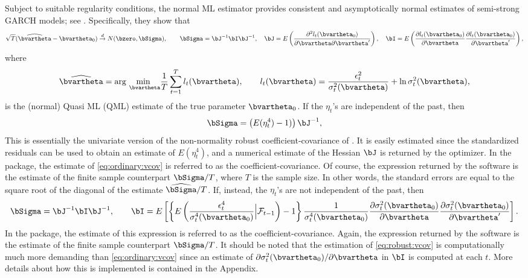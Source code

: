 Subject to suitable regularity conditions, the normal ML estimator provides consistent and asymptotically normal estimates of semi-strong GARCH models; see \citet{FrancqThieu2018}. Specifically, they show that
%
\begin{equation}\label{eq:can:result}
	\sqrt{T}(\widehat{\bvartheta} - \bvartheta_0) \overset{d}{\rightarrow} N(\bzero,\bSigma), \qquad \bSigma = \bJ^{-1}\bI\bJ^{-1}, \quad \bJ = E\left( \frac{ \partial^2 l_t(\bvartheta_0) }{ \partial\bvartheta\partial\bvartheta' } \right), \quad \bI = E\left( \frac{ \partial l_t(\bvartheta_0) }{ \partial\bvartheta } \frac{ \partial l_t(\bvartheta_0) }{ \partial\bvartheta' } \right),
\end{equation}
%
where
%
\begin{equation}\label{eq:qml:estimator}
	\widehat{\bvartheta} = \text{arg }\underset{\bvartheta}{\text{min }} \frac{1}{T} \sum_{t=1}^T l_t(\bvartheta), \qquad l_t(\bvartheta) = \frac{\epsilon_t^2}{\sigma_t^2(\bvartheta)} + \ln\sigma_t^2(\bvartheta),
\end{equation}
%
is the (normal) Quasi ML (QML) estimate of the true parameter $\bvartheta_0$. If the $\eta_t$'s are independent of the past, then
%
\begin{equation}\label{eq:ordinary:vcov}
	\bSigma = \left(E(\eta_t^4) - 1)\right) \bJ^{-1},
\end{equation}
%
This is essentially the univariate version of the non-normality robust coefficient-covariance of \citet{Bollerslevetal92a}. It is easily estimated since the standardized residuals can be used to obtain an estimate of $E(\eta_t^4)$, and a numerical estimate of the Hessian $\bJ$ is returned by the optimizer. In the  package, the estimate of \eqref{eq:ordinary:vcov} is referred to as the  coefficient-covariance. Of course, the expression returned by the software is the estimate of the finite sample counterpart $\bSigma/T$, where $T$ is the sample size. In other words, the standard errors are equal to the square root of the diagonal of the estimate $\widehat{\bSigma}/T$. If, instead, the $\eta_t$'s are not independent of the past, then
%
\begin{equation}\label{eq:robust:vcov}
	\bSigma = \bJ^{-1}\bI\bJ^{-1}, \qquad \bI = E\left[ \left\{ E\left( \frac{\epsilon_t^4}{\sigma_t^4(\bvartheta_0)} \Bigr| \mathcal{F}_{t-1} \right) - 1 \right\} \frac{ 1 }{ \sigma_t^4(\bvartheta_0) } \frac{ \partial\sigma_t^2(\bvartheta_0) }{ \partial\bvartheta } \frac{ \partial\sigma_t^2(\bvartheta_0) }{ \partial\bvartheta' } \right].
\end{equation}
%
In the  package, the estimate of this expression is referred to as the  coefficient-covariance. Again, the expression returned by the software is the estimate of the finite sample counterpart $\bSigma/T$. It should be noted that the estimation of \eqref{eq:robust:vcov} is computationally much more demanding than \eqref{eq:ordinary:vcov} since an estimate of $\partial\sigma_t^2(\bvartheta_0) / \partial\bvartheta$ in $\bI$ is computed at each $t$. More details about how this is implemented is contained in the Appendix.

